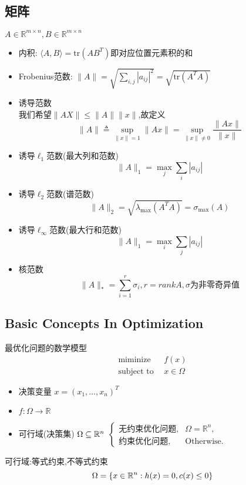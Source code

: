 \documentclass{mytemplate}
\begin{document}
\subsection{矩阵}
$A\in \mathbb{R}^{m \times n}, B \in \mathbb{R}^{m \times n}$
\begin{definition}
    \begin{itemize}
        \item 内积: $\langle A, B \rangle = \text{tr} (AB^T) \text{即对应位置元素积的和}$
        \item  Frobenius范数: $\|A\| = \sqrt{\sum_{i,j}|a_{ij}|^2} = \sqrt{\text{tr}(A^T A)}$
        \item 诱导范数\\
              我们希望$\|AX\| \leq \|A\| \|x\|$,故定义
              \[
                  \|A\| \triangleq \sup_{\|x\|=1} \|Ax\| = \sup_{\|x\|\neq0} \frac{\|Ax\|}{\|x\|}
              \]
        \item 诱导$\ell_1$范数(最大列和范数)
              \[
                  \|A\|_1 = \max_j \sum_{i}|a_{ij}|
              \]
        \item 诱导$\ell_2$范数(谱范数)
              \[
                  \|A\|_2 = \sqrt{\lambda_{\max}(A^T A)} = \sigma_{\max}(A)
              \]
        \item 诱导$\ell_{\infty}$范数(最大行和范数)
              \[
                  \|A\|_1 = \max_i \sum_{j}|a_{ij}|
              \]
        \item 核范数
              \[
                  \|A\|_* = \sum_{i=1}^{r} \sigma_i, r=rank{A},\sigma\text{为非零奇异值}
              \]
    \end{itemize}
\end{definition}
\subsection{Basic Concepts In Optimization}
\begin{definition}
    最优化问题的数学模型\\
    \begin{align}
        \text{miminize}  \ \  & f(x)         \\
        \text{subject to}\ \  & x \in \Omega
    \end{align}
    \begin{itemize}
        \item 决策变量 $x=(x_1, \dots, x_n)^T$\\
        \item \(f: \Omega \rightarrow \mathbb{R}\)\\
        \item 可行域(决策集) \( \Omega \subseteq \mathbb{R}^n\)
              $\begin{cases}
                      \text{无约束优化问题}, & \Omega = \mathbb{R}^n, \\
                      \text{约束优化问题},  & \text{Otherwise.}
                  \end{cases}
              $
    \end{itemize}
    可行域:等式约束,不等式约束
    \[
        \Omega = \{ x \in \mathbb{R}^n: h(x) =0, c(x) \leq 0 \}
    \]
\end{definition}
\end{document}

